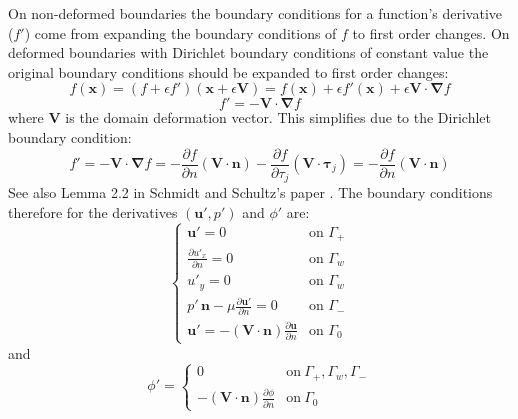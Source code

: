 \documentclass[12pt, a4paper]{article}
\begin{document}
        On non-deformed boundaries the boundary conditions for a function's derivative ($f'$) come from expanding the boundary conditions of $f$ to first order changes. On deformed boundaries with Dirichlet boundary conditions of constant value the original boundary conditions should be expanded to first order changes:
        \begin{equation}
            f(\mathbf{x}) = (f + \epsilon f') (\mathbf{x} + \epsilon \mathbf{V}) =
                f(\mathbf{x}) + \epsilon f'(\mathbf{x}) + \epsilon \mathbf{V \cdot} \boldsymbol{\nabla} f
        \end{equation}
        \begin{equation}
            f' = - \mathbf{V \cdot} \boldsymbol{\nabla} f
        \end{equation}
        where $\mathbf{V}$ is the domain deformation vector. This simplifies due to the Dirichlet boundary condition:
        \begin{equation}
            f' = - \mathbf{V \cdot} \boldsymbol{\nabla} f = 
                 - \frac{\partial f}{\partial n} (\mathbf{V \cdot n}) -
                 \frac{\partial f}{\partial \tau_j} (\mathbf{V \cdot} \boldsymbol{\tau}_j) = 
                 - \frac{\partial f}{\partial n} (\mathbf{V \cdot n})
        \end{equation}
        See also Lemma 2.2 in Schmidt and Schultz's paper \cite{Schmidt_1}. The boundary conditions therefore for the derivatives $(\mathbf{u'}, p')$ and $\phi'$ are:
        \begin{equation} \label{flow_der_boundary_conditions}
        \begin{cases}
            \mathbf{u'} = 0 & \text{on } \Gamma_+ \\
            \frac{\partial u'_x}{\partial n} = 0 & \text{on } \Gamma_w \\
            u'_y = 0  & \text{on } \Gamma_w \\
            p' \, \mathbf{n} - \mu \frac{\partial \mathbf{u'}}{\partial n} = 0 & \text{on } \Gamma_- \\
            \mathbf{u'} = - (\mathbf{V \cdot n}) \frac{\partial \mathbf{u}}{\partial n} & \text{on } \Gamma_0
        \end{cases}
        \end{equation}
        and
        \begin{equation} \label{phi_der_boundary_conditons}
          \phi' = \begin{cases}
               0	 &	\text{on}\ \Gamma_+, \Gamma_w, \Gamma_- \\
               - (\mathbf{V \cdot n}) \frac{\partial \phi}{\partial n}	 &	\text{on}\ \Gamma_0
            \end{cases}
        \end{equation}
        
\end{document}
